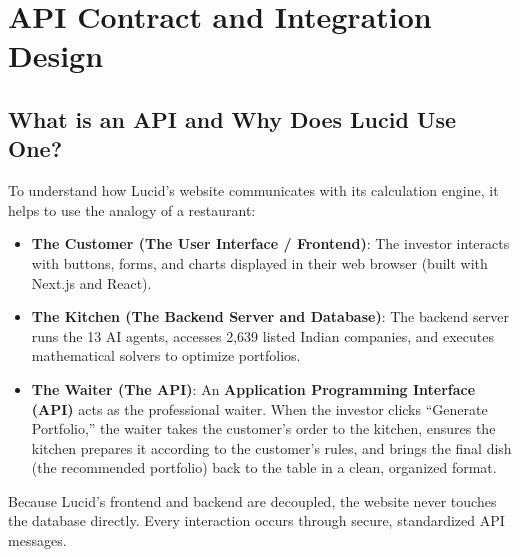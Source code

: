 \chapter{API Contract and Integration Design}

\section{What is an API and Why Does Lucid Use One?}
To understand how Lucid's website communicates with its calculation engine, it helps to use the analogy of a restaurant:
\begin{itemize}
    \item \textbf{The Customer (The User Interface / Frontend)}: The investor interacts with buttons, forms, and charts displayed in their web browser (built with Next.js and React).
    \item \textbf{The Kitchen (The Backend Server and Database)}: The backend server runs the 13 AI agents, accesses 2,639 listed Indian companies, and executes mathematical solvers to optimize portfolios.
    \item \textbf{The Waiter (The API)}: An \textbf{Application Programming Interface (API)} acts as the professional waiter. When the investor clicks ``Generate Portfolio,'' the waiter takes the customer's order to the kitchen, ensures the kitchen prepares it according to the customer's rules, and brings the final dish (the recommended portfolio) back to the table in a clean, organized format.
\end{itemize}

Because Lucid's frontend and backend are decoupled, the website never touches the database directly. Every interaction occurs through secure, standardized API messages.

